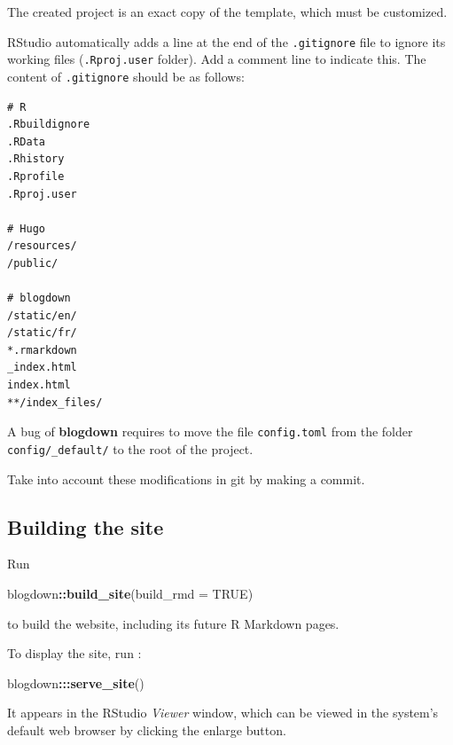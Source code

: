 \documentclass[
  12pt,
  american,
  a4paper,
  extrafontsizes,onecolumn,openright
  ]{memoir}
\newenvironment{Shaded}{\begin{snugshade}}{\end{snugshade}}
\newcommand{\AttributeTok}[1]{\textcolor[rgb]{0.13,0.29,0.53}{#1}}
\newcommand{\ConstantTok}[1]{\textcolor[rgb]{0.56,0.35,0.01}{#1}}
\newcommand{\FunctionTok}[1]{\textcolor[rgb]{0.13,0.29,0.53}{\textbf{#1}}}
\newcommand{\NormalTok}[1]{#1}
\newcommand{\SpecialCharTok}[1]{\textcolor[rgb]{0.81,0.36,0.00}{\textbf{#1}}}
\begin{document}
\normalsize

The created project is an exact copy of the template, which must be customized.

RStudio automatically adds a line at the end of the \texttt{.gitignore} file to ignore its working files (\texttt{.Rproj.user} folder).
Add a comment line to indicate this.
The content of \texttt{.gitignore} should be as follows:

\begin{verbatim}
# R
.Rbuildignore
.RData
.Rhistory
.Rprofile
.Rproj.user

# Hugo
/resources/
/public/

# blogdown
/static/en/
/static/fr/
*.rmarkdown
_index.html
index.html
**/index_files/
\end{verbatim}

A bug of \textbf{blogdown} requires to move the file \texttt{config.toml} from the folder \texttt{config/\_default/} to the root of the project.

Take into account these modifications in git by making a commit.

\subsection{Building the site}\label{building-the-site}

Run

\scriptsize

\begin{Shaded}
\begin{Highlighting}[]
\NormalTok{blogdown}\SpecialCharTok{::}\FunctionTok{build\_site}\NormalTok{(}\AttributeTok{build\_rmd =} \ConstantTok{TRUE}\NormalTok{)}
\end{Highlighting}
\end{Shaded}

\normalsize

to build the website, including its future R Markdown pages.

To display the site, run :

\scriptsize

\begin{Shaded}
\begin{Highlighting}[]
\NormalTok{blogdown}\SpecialCharTok{:::}\FunctionTok{serve\_site}\NormalTok{()}
\end{Highlighting}
\end{Shaded}

\normalsize

It appears in the RStudio \emph{Viewer} window, which can be viewed in the system's default web browser by clicking the enlarge button.
\end{document}
